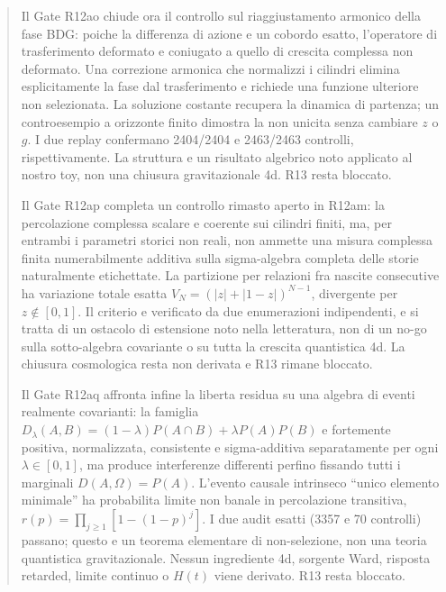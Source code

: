 \documentclass[11pt,a4paper]{article}
\begin{document}
\begin{abstract}
Il Gate R12ao chiude ora il controllo sul riaggiustamento armonico della fase BDG: poiche la differenza di azione e un cobordo esatto, l'operatore di trasferimento deformato e coniugato a quello di crescita complessa non deformato. Una correzione armonica che normalizzi i cilindri elimina esplicitamente la fase dal trasferimento e richiede una funzione ulteriore non selezionata. La soluzione costante recupera la dinamica di partenza; un controesempio a orizzonte finito dimostra la non unicita senza cambiare $z$ o $g$. I due replay confermano 2404/2404 e 2463/2463 controlli, rispettivamente. La struttura e un risultato algebrico noto applicato al nostro toy, non una chiusura gravitazionale 4d. R13 resta bloccato.\par
\par Il Gate R12ap completa un controllo rimasto aperto in R12am: la percolazione complessa scalare e coerente sui cilindri finiti, ma, per entrambi i parametri storici non reali, non ammette una misura complessa finita numerabilmente additiva sulla sigma-algebra completa delle storie naturalmente etichettate. La partizione per relazioni fra nascite consecutive ha variazione totale esatta $V_N=(|z|+|1-z|)^{N-1}$, divergente per $z\notin[0,1]$. Il criterio e verificato da due enumerazioni indipendenti, e si tratta di un ostacolo di estensione noto nella letteratura, non di un no-go sulla sotto-algebra covariante o su tutta la crescita quantistica 4d. La chiusura cosmologica resta non derivata e R13 rimane bloccato.

\par Il Gate R12aq affronta infine la liberta residua su una algebra di eventi realmente
covarianti: la famiglia $D_\lambda(A,B)=(1-\lambda)P(A\cap B)+\lambda P(A)P(B)$
e fortemente positiva, normalizzata, consistente e sigma-additiva separatamente
per ogni $\lambda\in[0,1]$, ma produce interferenze differenti perfino fissando
tutti i marginali $D(A,\Omega)=P(A)$. L'evento causale intrinseco ``unico elemento
minimale'' ha probabilita limite non banale in percolazione transitiva,
$r(p)=\prod_{j\ge1}[1-(1-p)^j]$. I due audit esatti (3357 e 70 controlli)
passano; questo e un teorema elementare di non-selezione, non una teoria
quantistica gravitazionale. Nessun ingrediente 4d, sorgente Ward, risposta
retarded, limite continuo o $H(t)$ viene derivato. R13 resta bloccato.



\end{abstract}
\end{document}
